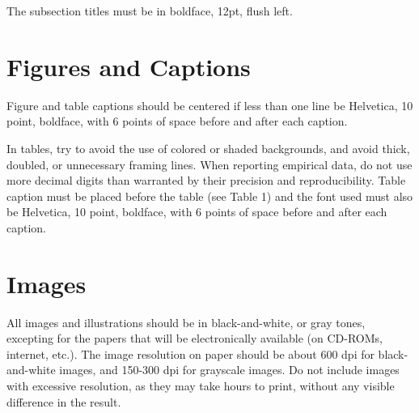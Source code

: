 \documentclass[12pt]{article}
\begin{document}
The subsection titles must be in boldface, 12pt, flush left.

\section{Figures and Captions}\label{sec:figs}


Figure and table captions should be centered if less than one line
be Helvetica, 10 point, boldface, with 6 points of space before and after each
caption.



In tables, try to avoid the use of colored or shaded backgrounds, and avoid
thick, doubled, or unnecessary framing lines. When reporting empirical data,
do not use more decimal digits than warranted by their precision and
reproducibility. Table caption must be placed before the table (see Table 1)
and the font used must also be Helvetica, 10 point, boldface, with 6 points of
space before and after each caption.


\section{Images}

All images and illustrations should be in black-and-white, or gray tones,
excepting for the papers that will be electronically available (on CD-ROMs,
internet, etc.). The image resolution on paper should be about 600 dpi for
black-and-white images, and 150-300 dpi for grayscale images.  Do not include
images with excessive resolution, as they may take hours to print, without any
visible difference in the result. 
\end{document}
